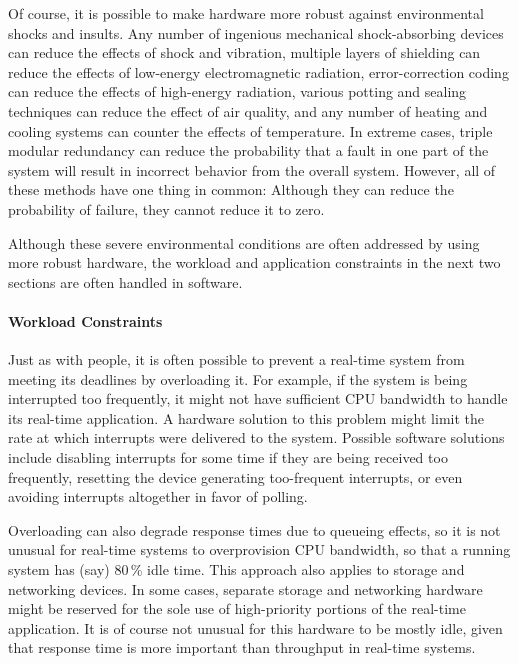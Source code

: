 Of course, it is possible to make hardware more robust against
environmental shocks and insults.
Any number of ingenious mechanical shock-absorbing devices can reduce the
effects of shock and vibration, multiple layers of shielding can reduce
the effects of low-energy electromagnetic radiation, error-correction
coding can reduce the effects of high-energy radiation, various potting
and sealing techniques can reduce the effect of air quality, and any
number of heating and cooling systems can counter the effects of temperature.
In extreme cases, triple modular redundancy can reduce the probability that
a fault in one part of the system will result in incorrect behavior from
the overall system.
However, all of these methods have one thing in common:  Although they
can reduce the probability of failure, they cannot reduce it to zero.

Although these severe environmental conditions are often addressed by using
more robust hardware, the
workload and application constraints in the next two sections are often
handled in software.

\paragraph{Workload Constraints}
\label{sec:advsync:Workload Constraints}

Just as with people, it is often possible to prevent a real-time system
from meeting its deadlines by overloading it.
For example, if the system is being interrupted too frequently, it might
not have sufficient CPU bandwidth to handle its real-time application.
A hardware solution to this problem might limit the rate at which
interrupts were delivered to the system.
Possible software solutions include disabling interrupts for some time if
they are being received too frequently,
resetting the device generating too-frequent interrupts,
or even avoiding interrupts altogether in favor of polling.

Overloading can also degrade response times due to queueing effects,
so it is not unusual for real-time systems to overprovision CPU bandwidth,
so that a running system has (say) 80\,\% idle time.
This approach also applies to storage and networking devices.
In some cases, separate storage and networking hardware might be reserved
for the sole use of high-priority portions of the real-time application.
It is of course not unusual for this hardware to be mostly idle, given
that response time is more important than throughput in
real-time systems.

